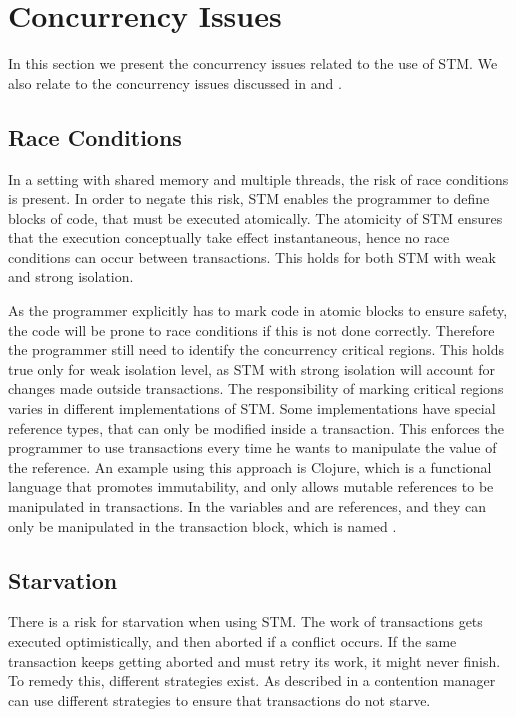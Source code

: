 \section{Concurrency Issues}
In this section we present the concurrency issues related to the use of \ac{STM}. We also relate to the concurrency issues discussed in  and .
\label{sec:stm_issues}

\subsection{Race Conditions}
In a setting with shared memory and multiple threads, the risk of race conditions is present. In order to negate this risk, \ac{STM} enables the programmer to define blocks of code, that must be executed atomically. The atomicity of \ac{STM} ensures that the execution conceptually take effect instantaneous, hence no race conditions can occur between transactions. This holds for both \ac{STM} with weak and strong isolation.

As the programmer explicitly has to mark code in atomic blocks to ensure safety, the code will be prone to race conditions if this is not done correctly. Therefore the programmer still need to identify the concurrency critical regions. This holds true only for weak isolation level, as \ac{STM} with strong isolation will account for changes made outside transactions. The responsibility of marking critical regions varies in different implementations of \ac{STM}. Some implementations have special reference types, that can only be modified inside a transaction. This enforces the programmer to use transactions every time he wants to manipulate the value of the reference. An example using this approach is Clojure, which is a functional language that promotes immutability, and only allows mutable references to be manipulated in transactions. In  the variables  and  are references, and they can only be manipulated in the transaction block, which is named .

\subsection{Starvation}
There is a risk for starvation when using \ac{STM}. The work of transactions gets executed optimistically, and then aborted if a conflict occurs. If the same transaction keeps getting aborted and must retry its work, it might never finish. To remedy this, different strategies exist. As described in  a contention manager can use different strategies to ensure that transactions do not starve. 

